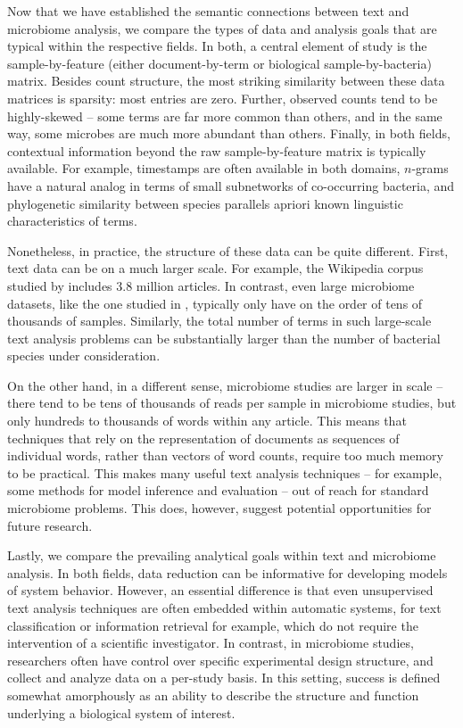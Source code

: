 \documentclass{article}
\begin{document}
Now that we have established the semantic connections between text and
microbiome analysis, we compare the types of data and analysis goals that are
typical within the respective fields. In both, a central element of study is
the sample-by-feature (either document-by-term or biological sample-by-bacteria)
matrix. Besides count structure, the most striking similarity between these data
matrices is sparsity: most entries are zero. Further, observed counts tend to be
highly-skewed -- some terms are far more common than others, and in the same
way, some microbes are much more abundant than others. Finally, in both fields,
contextual information beyond the raw sample-by-feature matrix is typically
available. For example, timestamps are often available in both domains,
$n$-grams have a natural analog in terms of small subnetworks of co-occurring
bacteria, and phylogenetic similarity between species parallels apriori known
linguistic characteristics of terms.

Nonetheless, in practice, the structure of these data can be quite different.
First, text data can be on a much larger scale. For example, the Wikipedia
corpus studied by \cite{hoffman2013stochastic} includes 3.8 million articles. In
contrast, even large microbiome datasets, like the one studied in
\citep{gilbert2014earth}, typically only have on the order of tens of thousands
of samples. Similarly, the total number of terms in such large-scale text
analysis problems can be substantially larger than the number of bacterial
species under consideration.

On the other hand, in a different sense, microbiome studies are larger in scale
-- there tend to be tens of thousands of reads per sample in microbiome studies,
but only hundreds to thousands of words within any article. This means that
techniques that rely on the representation of documents as sequences of
individual words, rather than vectors of word counts, require too much memory to
be practical. This makes many useful text analysis techniques -- for example,
some methods for model inference \citep{griffiths2004finding} and evaluation
\citep{wallach2009evaluation} -- out of reach for standard microbiome problems.
This does, however, suggest potential opportunities for future research.

Lastly, we compare the prevailing analytical goals within text and microbiome
analysis. In both fields, data reduction can be informative for developing
models of system behavior. However, an essential difference is that even
unsupervised text analysis techniques are often embedded within automatic
systems, for text classification \citep{blei2003latent} or information retrieval
\citep{krestel2009latent} for example, which do not require the intervention of
a scientific investigator. In contrast, in microbiome studies, researchers often
have control over specific experimental design structure, and collect and
analyze data on a per-study basis. In this setting, success is defined somewhat
amorphously as an ability to describe the structure and function underlying a
biological system of interest.
\end{document}
